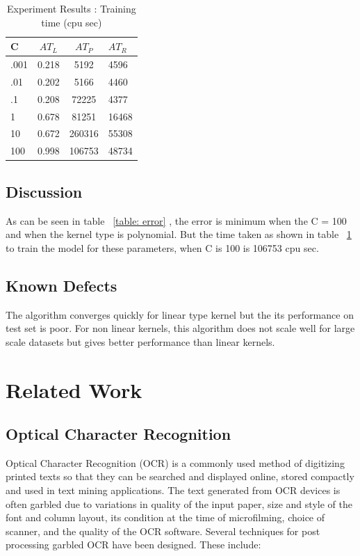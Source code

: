 \documentclass[letterpaper]{article}
\begin{document}
\begin{table}[htdp]
\begin{center}
\begin{tabular}{| l | c | c | l |}
\hline
C & $ AT_{L} $ & $AT_{P}$ & $AT_{R}$ \\
\hline
.001 & 0.218 & 5192 & 4596 \\
.01 & 0.202 & 5166 & 4460 \\
.1 & 0.208 & 72225 & 4377 \\
1 & 0.678 & 81251 & 16468 \\
10 & 0.672 & 260316 & 55308 \\
100 & 0.998 & 106753  & 48734  \\
\hline
\end{tabular}
\end{center}
\caption{Experiment Results : Training time (cpu sec)}
\label{table: runtime}
\end{table}

\subsection{Discussion}
As can be seen in table ~\ref{table: error} , the error is minimum when the C = 100 and when the kernel type is polynomial. But the time taken as shown in table ~\ref{table: runtime} to train the model for these parameters, when C is 100 is 106753 cpu sec.
\subsection{Known Defects}
The \cite{algo} algorithm converges quickly for linear type kernel but the its performance on test set is poor. For non linear kernels, this algorithm does not scale well for large scale datasets but gives better performance than linear kernels.

\section{Related Work}
\label{sec:related}
\subsection{Optical Character Recognition}
Optical Character Recognition (OCR) is a commonly used method of digitizing printed texts so that they can be searched and displayed online, stored compactly and used in text mining applications. The text generated from OCR devices is often garbled due to variations in quality of the input paper, size and style of the font and column layout, its condition at the time of microfilming, choice of scanner, and the quality of the OCR software.
Several techniques for post processing garbled OCR have been designed. These include:
\end{document}
